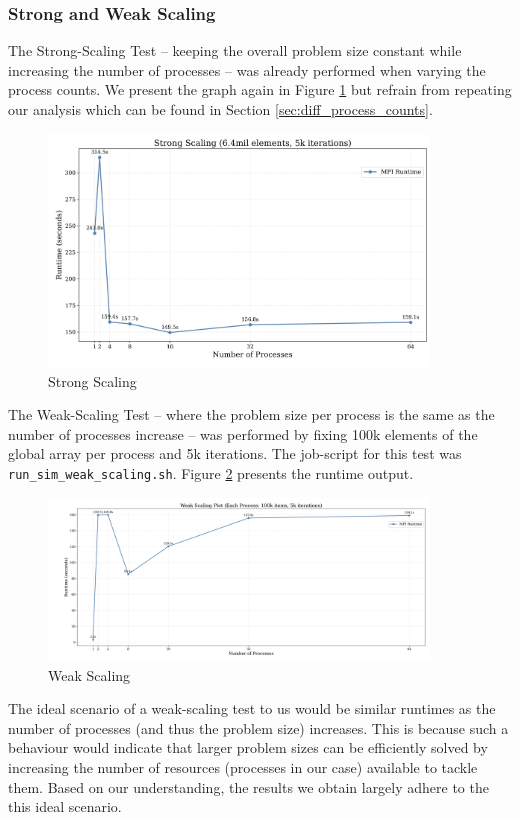 \documentclass[a4paper,10pt]{article}
\begin{document}
\subsubsection{Strong and Weak Scaling}
The Strong-Scaling Test -- keeping the overall problem size constant while increasing the number of processes -- was already performed when varying the process counts. We present the graph again in Figure \ref{fig:ex1_strong_scaling} but refrain from repeating our analysis which can be found in Section \ref{sec:diff_process_counts}. 
\begin{figure}[H]
  \centering
  \includegraphics[width=0.9\textwidth]{img/ex1/strong_scaling}
  \caption{Strong Scaling}
  \label{fig:ex1_strong_scaling}
\end{figure}

The Weak-Scaling Test -- where the problem size per process is the same as the number of processes increase -- was performed by fixing 100k elements of the global array per process and 5k iterations. The job-script for this test was \verb|run_sim_weak_scaling.sh|. Figure \ref{fig:ex1_weak_scaling} presents the runtime output. 
\begin{figure}[H]
  \centering
  \includegraphics[width=0.9\textwidth]{img/ex1/weak_scaling}
  \caption{Weak Scaling}
  \label{fig:ex1_weak_scaling}
\end{figure}
The ideal scenario of a weak-scaling test to us would be similar runtimes as the number of processes (and thus the problem size) increases. This is because such a behaviour would indicate that larger problem sizes can be efficiently solved by increasing the number of resources (processes in our case) available to tackle them. Based on our understanding, the results we obtain largely adhere to the this ideal scenario.
\end{document}
